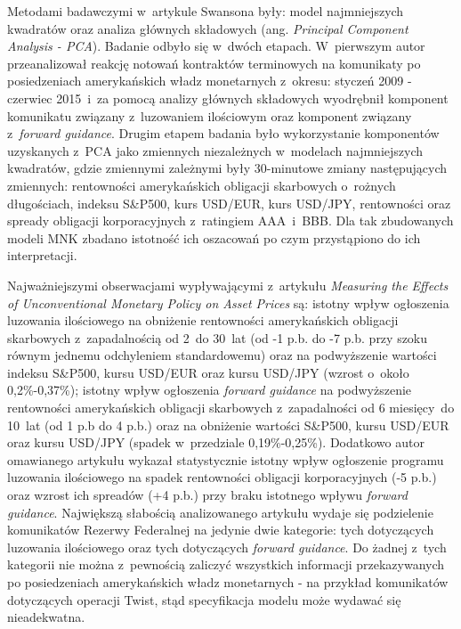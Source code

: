 Metodami badawczymi w~artykule Swansona były: model najmniejszych kwadratów oraz analiza głównych składowych (ang. \textit{Principal Component Analysis - PCA}). Badanie odbyło się w~dwóch etapach. W~pierwszym autor przeanalizował reakcję notowań kontraktów terminowych na komunikaty po posiedzeniach amerykańskich władz monetarnych z~okresu: styczeń 2009 - czerwiec 2015~i~za pomocą analizy głównych składowych wyodrębnił komponent komunikatu związany z~luzowaniem ilościowym oraz komponent związany z~\textit{forward guidance}. Drugim etapem badania było wykorzystanie komponentów uzyskanych z~\acs{PCA} jako zmiennych niezależnych w~modelach najmniejszych kwadratów, gdzie zmiennymi zależnymi były 30-minutowe zmiany następujących zmiennych: rentowności amerykańskich obligacji skarbowych o~rożnych długościach, indeksu S\&P500, kurs USD/EUR, kurs USD/JPY, rentowności oraz spready obligacji korporacyjnych z~ratingiem AAA~i~BBB. Dla tak zbudowanych modeli \acs{MNK} zbadano istotność ich oszacowań po czym przystąpiono do ich interpretacji.

Najważniejszymi obserwacjami wypływającymi z~artykułu \textit{Measuring the Effects of Unconventional Monetary Policy on Asset Prices} są: istotny wpływ ogłoszenia luzowania ilościowego na obniżenie rentowności amerykańskich obligacji skarbowych z~zapadalnością od 2~do 30~lat (od -1 p.b. do -7 p.b. przy szoku równym jednemu odchyleniem standardowemu) oraz na podwyższenie wartości indeksu S\&P500, kursu USD/EUR oraz kursu USD/JPY (wzrost o~około 0,2\%-0,37\%); istotny wpływ ogłoszenia \textit{forward guidance} na podwyższenie rentowności amerykańskich obligacji skarbowych z~zapadalności od 6 miesięcy~do 10~lat (od 1 p.b do 4 p.b.) oraz na obniżenie wartości S\&P500, kursu USD/EUR oraz kursu USD/JPY (spadek w~przedziale 0,19\%-0,25\%). Dodatkowo autor omawianego artykułu wykazał statystycznie istotny wpływ ogłoszenie programu luzowania ilościowego na spadek rentowności obligacji korporacyjnych (-5 p.b.) oraz wzrost ich spreadów (+4 p.b.) przy braku istotnego wpływu \textit{forward guidance}. Największą słabością analizowanego artykułu wydaje się podzielenie komunikatów Rezerwy Federalnej na jedynie dwie kategorie: tych dotyczących luzowania ilościowego oraz tych dotyczących \textit{forward guidance}. Do żadnej z~tych kategorii nie można z~pewnością zaliczyć wszystkich informacji przekazywanych po posiedzeniach amerykańskich władz monetarnych - na przykład komunikatów dotyczących operacji Twist, stąd specyfikacja modelu może wydawać się nieadekwatna.

